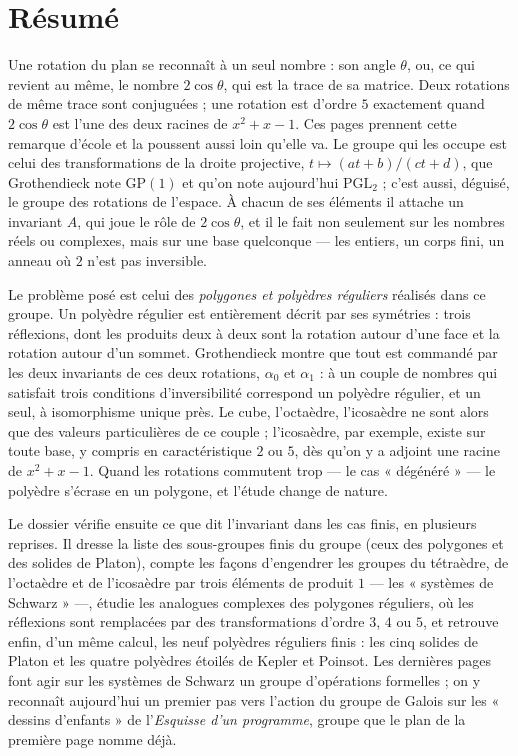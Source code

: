 \documentclass[11pt,a4paper]{article}
\begin{document}
\section*{Résumé}

\begin{resume}
Une rotation du plan se reconnaît à un seul nombre : son angle $\theta$, ou,
ce qui revient au même, le nombre $2\cos\theta$, qui est la trace de sa
matrice. Deux rotations de même trace sont conjuguées ; une rotation est
d'ordre $5$ exactement quand $2\cos\theta$ est l'une des deux racines de
$x^2 + x - 1$. Ces pages prennent cette remarque d'école et la poussent aussi
loin qu'elle va. Le groupe qui les occupe est celui des transformations de la
droite projective, $t \mapsto (at + b)/(ct + d)$, que Grothendieck note
$\mathrm{GP}(1)$ et qu'on note aujourd'hui $\mathrm{PGL}_2$ ; c'est aussi,
déguisé, le groupe des rotations de l'espace. À chacun de ses éléments il
attache un invariant $A$, qui joue le rôle de $2\cos\theta$, et il le fait
non seulement sur les nombres réels ou complexes, mais sur une base
quelconque --- les entiers, un corps fini, un anneau où $2$ n'est pas
inversible.

Le problème posé est celui des \emph{polygones et polyèdres réguliers}
réalisés dans ce groupe. Un polyèdre régulier est entièrement décrit par ses
symétries : trois réflexions, dont les produits deux à deux sont la rotation
autour d'une face et la rotation autour d'un sommet. Grothendieck montre que
tout est commandé par les deux invariants de ces deux rotations, $\alpha_0$ et
$\alpha_1$ : à un couple de nombres qui satisfait trois conditions
d'inversibilité correspond un polyèdre régulier, et un seul, à isomorphisme
unique près. Le cube, l'octaèdre, l'icosaèdre ne sont alors que des valeurs
particulières de ce couple ; l'icosaèdre, par exemple, existe sur toute base,
y compris en caractéristique $2$ ou $5$, dès qu'on y a adjoint une racine de
$x^2 + x - 1$. Quand les rotations commutent trop --- le cas « dégénéré » ---
le polyèdre s'écrase en un polygone, et l'étude change de nature.

Le dossier vérifie ensuite ce que dit l'invariant dans les cas finis, en
plusieurs reprises. Il dresse la liste des sous-groupes finis du groupe (ceux
des polygones et des solides de Platon), compte les façons d'engendrer les
groupes du tétraèdre, de l'octaèdre et de l'icosaèdre par trois éléments de
produit $1$ --- les « systèmes de Schwarz » ---, étudie les analogues
complexes des polygones réguliers, où les réflexions sont remplacées par des
transformations d'ordre $3$, $4$ ou $5$, et retrouve enfin, d'un même calcul,
les neuf polyèdres réguliers finis : les cinq solides de Platon et les quatre
polyèdres étoilés de Kepler et Poinsot. Les dernières pages font agir sur
les systèmes de Schwarz un groupe d'opérations formelles ; on y reconnaît
aujourd'hui un premier pas vers l'action du groupe de Galois sur les
« dessins d'enfants » de l'\emph{Esquisse d'un programme}, groupe que le plan
de la première page nomme déjà.


\end{resume}
\end{document}
